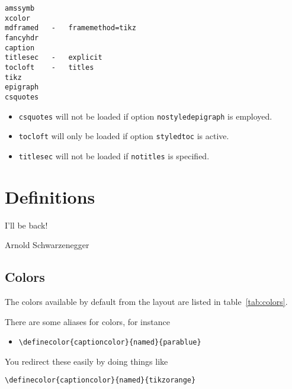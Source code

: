 \documentclass[book]{scrbook}
\begin{document}
\begin{verbatim}
amssymb
xcolor
mdframed   -   framemethod=tikz
fancyhdr
caption
titlesec   -   explicit
tocloft    -   titles
tikz
epigraph
csquotes
\end{verbatim}

\begin{itemize}
  \item \verb|csquotes| will not be loaded if option \verb|nostyledepigraph| is employed.
  \item \verb|tocloft| will only be loaded if option \verb|styledtoc| is active.
  \item \verb|titlesec| will not be loaded if \verb|notitles| is specified.
\end{itemize}


\chapter{Definitions}
\epigraph{I'll be back!}{Arnold Schwarzenegger \cite{abc}}

\section{Colors}

The colors available by default from the layout are listed in table~\ref{tab:colors}.

There are some aliases for colors, for instance
\begin{itemize}
\item \verb|\definecolor{captioncolor}{named}{parablue}|
\end{itemize}

You redirect these easily by doing things like
\begin{verbatim}
\definecolor{captioncolor}{named}{tikzorange}
\end{verbatim}
\end{document}
